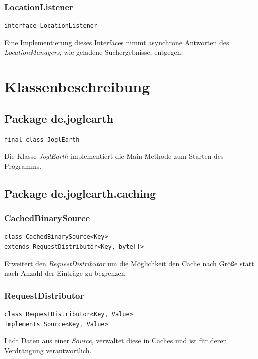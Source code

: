 \documentclass[10pt]{scrreprt}
\begin{document}
\vspace{5mm}
\subsection*{LocationListener}
\begin{lstlisting}
interface LocationListener
\end{lstlisting}
Eine Implementierung dieses Interfaces nimmt asynchrone Antworten des \textit{LocationManagers}, wie geladene Suchergebnisse, entgegen.\\




\chapter{Klassenbeschreibung}
\section{Package de.joglearth}
\begin{lstlisting}
final class JoglEarth
\end{lstlisting}
Die Klasse \textit{JoglEarth} implementiert die Main-Methode zum Starten des Programms.\\

\vspace{5mm}
\section{Package de.joglearth.caching}
\subsection*{CachedBinarySource}
\begin{lstlisting}
class CachedBinarySource<Key>
extends RequestDistributor<Key, byte[]>
\end{lstlisting}
Erweitert den \textit{RequestDistributor} um die Möglichkeit den Cache nach Größe statt nach Anzahl der Einträge zu begrenzen.\\

\vspace{5mm}
\subsection*{RequestDistributor}
\begin{lstlisting}
class RequestDistributor<Key, Value>
implements Source<Key, Value>
\end{lstlisting}
Lädt Daten aus einer \textit{Source}, verwaltet diese in Caches und ist für deren Verdrängung verantwortlich.\\
\end{document}
